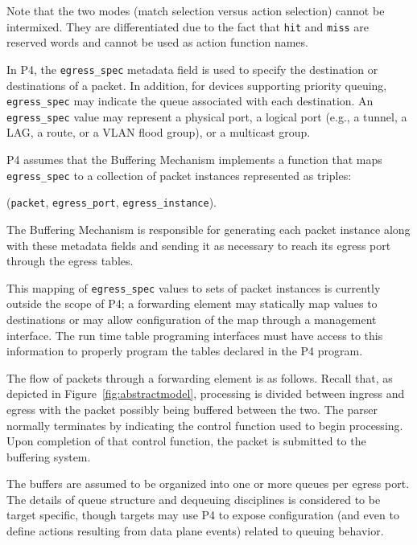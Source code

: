 \documentclass[12pt]{article}
\begin{document}
Note that the two modes (match selection versus action selection) cannot be
intermixed. They are differentiated due to the fact that \texttt{hit} and
\texttt{miss} are reserved words and cannot be used as action function names.



In P4, the \texttt{egress_spec} metadata field is used to specify the destination 
or destinations of a packet. In addition, for devices supporting priority 
queuing, \texttt{egress_spec} may indicate the queue associated with each destination. 
An \texttt{egress_spec} value may represent a physical port, a logical port (e.g., 
a tunnel, a LAG, a route, or a VLAN flood group), or a multicast group.

P4 assumes that the Buffering Mechanism implements a function that maps \texttt{egress_spec} to 
a collection of packet instances represented as triples:

\centerline{(\texttt{packet}, \texttt{egress_port}, \texttt{egress_instance}).}

The Buffering Mechanism is responsible for generating 
each packet instance along with these metadata fields and sending it as necessary 
to reach its egress port through the egress \matchaction tables. 

This mapping of \texttt{egress_spec} values to sets of packet instances is currently 
outside the scope of P4; a forwarding element may statically map values to 
destinations or may allow configuration of the map through a management interface. 
The run time table programing interfaces must have access to this information 
to properly program the tables declared in the P4 program.

The flow of packets through a forwarding element is as follows. Recall that, 
as depicted in Figure~\ref{fig:abstractmodel}, processing is divided between ingress and egress 
with the packet possibly being buffered between the two. The parser normally 
terminates by indicating the control function used to begin processing.  Upon 
completion of that control function, the packet is submitted to the buffering 
system.

The buffers are assumed to be organized into one or more queues per egress 
port. The details of queue structure and dequeuing disciplines is considered 
to be target specific, though targets may use P4 to expose configuration (and 
even to define actions resulting from data plane events) related to queuing 
behavior.
\end{document}
